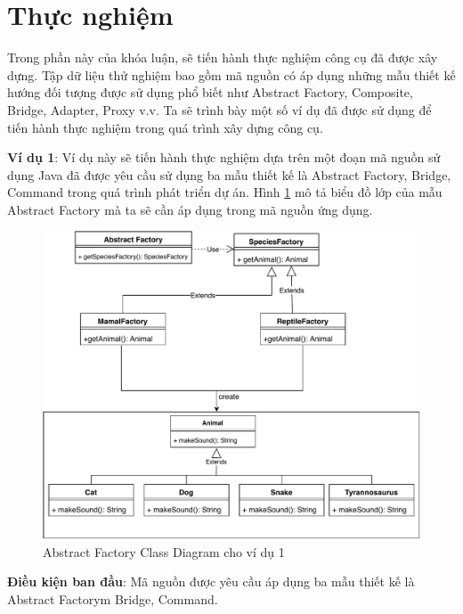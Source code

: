 \documentclass[12pt]{report}
\begin{document}
\section{Thực nghiệm}
Trong phần này của khóa luận, sẽ tiến hành thực nghiệm công cụ đã được xây dựng. Tập dữ liệu thử nghiệm bao gồm mã nguồn có áp dụng những mẫu thiết kế hướng đối tượng được sử dụng phổ biết như Abstract Factory, Composite, Bridge, Adapter, Proxy v.v.
\noindent Ta sẽ trình bày một số ví dụ đã được sử dụng để tiến hành thực nghiệm trong quá trình xây dựng công cụ.

\noindent \textbf{Ví dụ 1}: Ví dụ này sẽ tiến hành thực nghiệm dựa trên một đoạn mã nguồn sử dụng Java đã được yêu cầu sử dụng ba mẫu thiết kế là Abstract Factory, Bridge, Command trong quá trình phát triển dự án. Hình \ref{fig:abstract_factory_diagram} mô tả biểu đồ lớp của mẫu Abstract Factory mà ta sẽ cần áp dụng trong mã nguồn ứng dụng.
\begin{figure}[h]
	\centering
	\includegraphics[scale=0.8]{images/_abstract_factory.pdf}
	\caption{Abstract Factory Class Diagram cho ví dụ 1}
	\label{fig:abstract_factory_diagram}
\end{figure}

\noindent \textbf{Điều kiện ban đầu}: Mã nguồn được yêu cầu áp dụng ba mẫu thiết kế là Abstract Factorym Bridge, Command.
\end{document}
